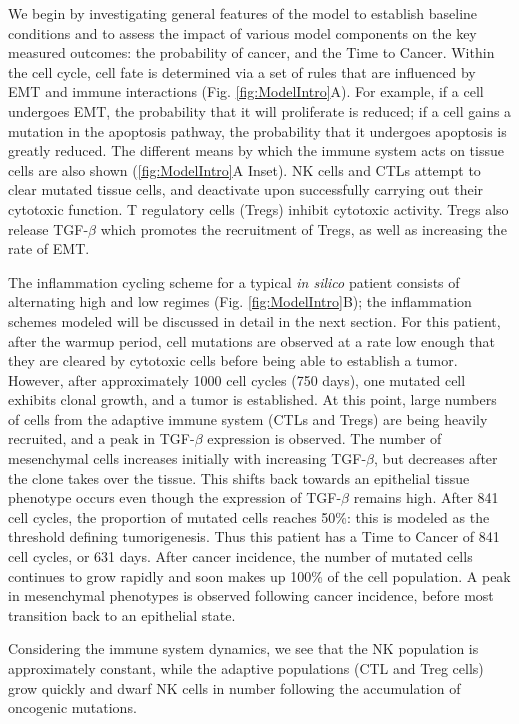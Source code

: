 \documentclass[11pt]{article}
\begin{document}
We begin by investigating general features of the model to establish baseline conditions and to assess the impact of various model components on the key measured outcomes: the probability of cancer, and the Time to Cancer. 
Within the cell cycle, cell fate is determined via a set of rules that are influenced by EMT and immune interactions (Fig. \ref{fig:ModelIntro}A). For example, if a cell undergoes EMT, the probability that it will proliferate is reduced; if a cell gains a mutation in the apoptosis pathway, the probability that it undergoes apoptosis is greatly reduced. The different means by which the immune system acts on tissue cells are also shown (\ref{fig:ModelIntro}A Inset). NK cells and CTLs attempt to clear mutated tissue cells, and deactivate upon successfully carrying out their cytotoxic function. T regulatory cells (Tregs) inhibit cytotoxic activity. Tregs also release TGF-$\beta$ which promotes the recruitment of Tregs, as well as increasing the rate of EMT.
\par
The inflammation cycling scheme for a typical {\it in silico} patient consists of alternating high and low regimes (Fig. \ref{fig:ModelIntro}B); the inflammation schemes modeled will be discussed in detail in the next section. For this patient, after the warmup period, cell mutations are observed at a rate low enough that they are cleared by cytotoxic cells before being able to establish a tumor. However, after approximately 1000 cell cycles (750 days), one mutated cell exhibits clonal growth, and a tumor is established. At this point, large numbers of cells from the adaptive immune system (CTLs and Tregs) are being heavily recruited, and a peak in TGF-$\beta$ expression is observed. The number of mesenchymal cells increases initially with increasing TGF-$\beta$, but decreases after the clone takes over the tissue. This shifts back towards an epithelial tissue phenotype occurs even though the expression of TGF-$\beta$ remains high.
After 841 cell cycles, the proportion of mutated cells reaches 50\%: this is modeled as the threshold defining tumorigenesis. Thus this patient has a Time to Cancer of 841 cell cycles, or 631 days. 
After cancer incidence, the number of mutated cells continues to grow rapidly and soon makes up 100\% of the cell population. A peak in mesenchymal phenotypes is observed following cancer incidence, before most transition back to an epithelial state.
\par 
Considering the immune system dynamics, we see that the NK population is approximately constant, while the adaptive populations (CTL and Treg cells) grow quickly and dwarf NK cells in number following the accumulation of oncogenic mutations.
\end{document}
